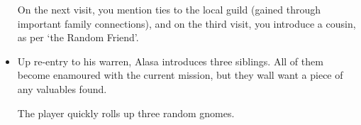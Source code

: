 \begin{multicols}{2}
\begin{itemize}
  On the next visit, you mention ties to the local guild (gained through important family connections), and on the third visit, you introduce a cousin, as per `the Random Friend'.
  \item
  Up re-entry to his warren, Alasa introduces three siblings.
  All of them become enamoured with the current mission, but they wall want a piece of any valuables found.

  The player quickly rolls up three random gnomes.
\end{itemize}

\end{multicols}
